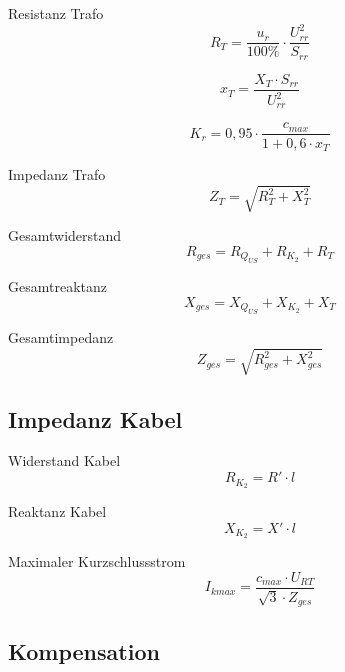 \documentclass[11pt, a4paper, draft, fleqn, twocolumn]{article}
\numberwithin{equation}{subsection}
\begin{document}
\noindent Resistanz Trafo
\begin{equation}
    R_T = \frac{u_r}{100\%} \cdot \frac{U_{rr}^2}{S_{rr}}
\end{equation}

\noindent 
\begin{equation}
    x_T = \frac{X_T \cdot S_{rr}}{U_{rr}^2}
\end{equation}

\noindent
\begin{equation}
    K_r = 0,95 \cdot \frac{c_{max}}{1 + 0,6 \cdot x_T}
\end{equation}

\noindent Impedanz Trafo
\begin{equation}
    Z_T = \sqrt{R_T^2 + X_T^2}
\end{equation}

\noindent Gesamtwiderstand
\begin{equation}
    R_{ges} = R_{Q_{US}} + R_{K_{2}} + R_T
\end{equation}

\noindent Gesamtreaktanz
\begin{equation}
    X_{ges} = X_{Q_{US}} + X_{K_{2}} + X_T
\end{equation}

\noindent Gesamtimpedanz
\begin{equation}
    Z_{ges} = \sqrt{R_{ges}^2 + X_{ges}^2}
\end{equation}


\subsection{Impedanz Kabel}

Widerstand Kabel
\begin{equation}
    R_{K_{2}} = R' \cdot l
\end{equation}

\noindent Reaktanz Kabel
\begin{equation}
    X_{K_{2}} = X' \cdot l
\end{equation}

\noindent Maximaler Kurzschlussstrom
\begin{equation}
    I_{kmax} = \frac{c_{max} \cdot U_{RT}}{\sqrt{3} \cdot Z_{ges}}
\end{equation}


\subsection{Kompensation}
\end{document}

